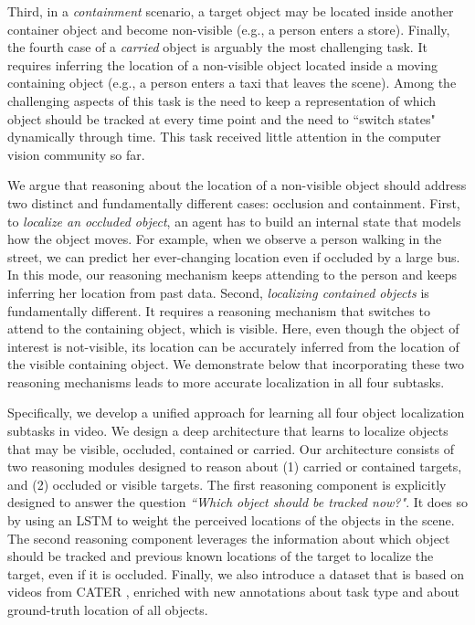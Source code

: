 \documentclass[]{llncs}
\begin{document}
Third, in a \textit{containment} scenario, a target object may be located inside another container object and become non-visible \cite{ullman2019model} (e.g., a person enters a store).
Finally, the fourth case of a \textit{carried} object is arguably the most challenging task. It requires inferring the location of a non-visible object located inside a moving containing object (e.g., a person enters a taxi that leaves the scene). Among the challenging aspects of this task is the need to keep a representation of which object should be tracked at every time point and the need to ``switch states" dynamically through time. This task received little attention in the computer vision community so far.  

We argue that reasoning about the location of a non-visible object should address two distinct and fundamentally different cases: occlusion and containment. First, to \textit{localize an occluded object}, an agent has to build an internal state that models how the object moves. For example, when we observe a person walking in the street, we can predict her ever-changing location even if occluded by a large bus. In this mode, our reasoning mechanism keeps attending to the person and keeps inferring her location from past data. Second, \textit{localizing contained objects} is fundamentally different. It requires a reasoning mechanism that switches to attend to the containing object, which is visible. Here, even though the object of interest is not-visible, its location can be accurately inferred from the location of the visible containing object. We demonstrate below that incorporating these two reasoning mechanisms leads to more accurate localization in all four subtasks.

Specifically, we develop a unified approach for learning all four object localization subtasks in video. We design a deep architecture that learns to localize objects that may be visible, occluded, contained or carried. Our architecture consists of two reasoning modules designed to reason about (1) carried or contained targets, and (2) occluded or visible targets. The first reasoning component is explicitly designed to answer the question \textit{``Which object should be tracked now?"}. It does so by using an LSTM to weight the perceived locations of the objects in the scene. The second reasoning component leverages the information about which object should be tracked and previous known locations of the target to localize the target, even if it is occluded. Finally, we also introduce a dataset that is based on videos from CATER \cite{girdhar2019cater}, enriched with new annotations about task type and about ground-truth location of all objects.
\end{document}
